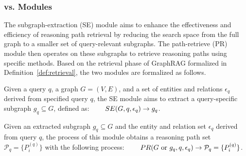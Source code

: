 \vspace{-5pt}
\subsubsection{{\bf {\PreRetrieval} {\bf vs.} {\Retrieval} Modules}}


The subgraph-extraction (SE) module aims to enhance the effectiveness and efficiency of reasoning path retrieval by reducing the search space from the full graph to a smaller set of query-relevant subgraphs. The path-retrieve (PR) module then operates on these subgraphs to retrieve reasoning paths using specific methods. 
Based on the retrieval phase of GraphRAG formalized in Definition~\ref{def:retrieval}, the two modules are formalized as follows.

\begin{definition}[\textbf{\PreRetrieval ~(\ShortPreRetrieval)}]
\label{def:pf}
\vspace{-5pt}
Given a query $q$, a graph $G = (V, E)$, and a set of entities and relations $\epsilon_q$ derived from specified query $q$, the SE module aims to extract a query-specific subgraph $g_q \subseteq G$, defined as:~~~~
$SE(G, q, \epsilon_q) \rightarrow g_q$.
\end{definition}



\begin{definition}[\textbf{\Retrieval~(\ShortRetrieval)}]
\vspace{-5pt}
Given an extracted subgraph $g_q \subseteq G$ and the entity and relation set $\epsilon_q$ derived from query $q$, the process of this module obtains a reasoning path set $\mathcal{P}_q = \{P_i^{(q)}\}$ with the following process:~~~~ $PR(G\text{~or~} g_q, q, \epsilon_q)  \rightarrow \mathcal{P}_q = \{P_i^{(q)}\}$.
\end{definition}

